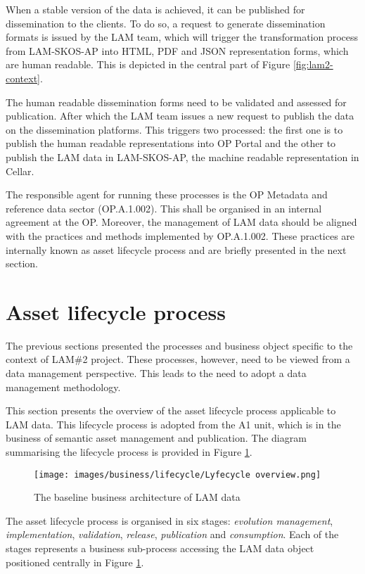 	When a stable version of the data is achieved, it can be published for dissemination to the clients. To do so, a request to generate dissemination formats is issued by the LAM team, which will trigger the transformation process from LAM-SKOS-AP into HTML, PDF and JSON representation forms, which are human readable. This is depicted in the central part of Figure \ref{fig:lam2-context}. 
	
	The human readable dissemination forms need to be validated and assessed for publication. After which the LAM team issues a new request to publish the data on the dissemination platforms. This triggers two processed: the first one is to publish the human readable representations into OP Portal and the other to publish the LAM data in LAM-SKOS-AP, the machine readable representation in Cellar. 
	
	The responsible agent for running these processes is the OP Metadata and reference data sector (OP.A.1.002). This shall be organised in an internal agreement at the OP. Moreover, the management of LAM data should be aligned with the practices and methods implemented by OP.A.1.002. These practices are internally known as asset lifecycle process and are briefly presented in the next section. 
	
	\section{Asset lifecycle process}
	\label{sec:asset-lifecycle}
	
	The previous sections presented the processes and business object specific to the context of LAM\#2 project. These processes, however, need to be viewed from a data management perspective. This leads to the need to adopt a data management methodology. 
	
	This section presents the overview of the asset lifecycle process applicable to LAM data. This lifecycle process is adopted from the A1 unit, which is in the business of semantic asset management and publication. The diagram summarising the lifecycle process is provided in Figure \ref{fig:lifecycle-overview}. 
	
	\begin{figure}[!h]
		\centering
		\texttt{[image: images/business/lifecycle/Lyfecycle overview.png]}
		\caption{The baseline business architecture of LAM data}
		\label{fig:lifecycle-overview}
	\end{figure} 

	The asset lifecycle process is organised in six stages: \textit{evolution management}, \textit{implementation}, \textit{validation}, \textit{release}, \textit{publication} and \textit{consumption}. Each of the stages represents a business sub-process accessing the LAM data object positioned centrally in Figure \ref{fig:lifecycle-overview}.
	
